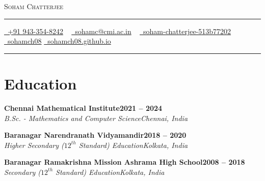 \documentclass[letterpaper,10pt]{article}
\newcommand{\documentTitle}[2]{
  \begin{center}
    {\Huge\scshape\color{accentTitle} #1}
    \vspace{10pt}
    {\color{accentLine} \hrule}
    \vspace{2pt}
    \footnotesize{#2}
    \vspace{2pt}
    {\color{accentLine} \hrule}
  \end{center}
}
\newcommand{\tinysection}[1]{
  \phantomsection
  \addcontentsline{toc}{section}{#1}
  {\scshape\large{\bfseries\color{accentText}#1} {\color{accentLine} |}}
}
\newcommand{\heading}[2]{
  \hspace{10pt}#1\hfill#2\\
}
\newcommand{\headingBf}[2]{
  \heading{\textbf{#1}}{\textbf{#2}}
}
\newcommand{\headingIt}[2]{
  \heading{\textit{#1}}{\textit{#2}}
}
\newenvironment{resume_list}{
  \vspace{-7pt}
  \begin{itemize}[itemsep=-2px, parsep=1pt, leftmargin=30pt]
}{
  \end{itemize}
}
\begin{document}

  \documentTitle{Soham Chatterjee}{
    \href{tel:+919433548242}{
      \raisebox{-0.05\height} \faPhone\ +91 943-354-8242} ~
    \href{mailto:sohamc@cmi.ac.in}{
      \raisebox{-0.15\height} \faEnvelope\ sohamc@cmi.ac.in} ~
    \href{https://linkedin.com/in/soham-chatterjee-513b77202/}{
      \raisebox{-0.15\height} \faLinkedin\ soham-chatterjee-513b77202} ~
    \href{https://github.com/sohamch08}{
      \raisebox{-0.15\height} \faGithub\ sohamch08}
   \href{https://sohamch08.github.io}{
  	\raisebox{-0.15\height} \faGlobe\ sohamch08.github.io}
  }

%


  \section{Education}


\begin{resume_list}
	\item \headingBf{Chennai Mathematical Institute}{2021 -- 2024}
	\headingIt{B.Sc. - Mathematics and Computer Science}{Chennai, India}
	\item \headingBf{Baranagar Narendranath Vidyamandir}{2018 -- 2020}
	\headingIt{Higher Secondary ($12^{th}$ Standard) Education}{Kolkata, India}
	\item \headingBf{Baranagar Ramakrishna Mission Ashrama High School}{2008 -- 2018}
	\headingIt{Secondary ($12^{th}$ Standard) Education}{Kolkata, India}
\end{resume_list}
\end{document}
